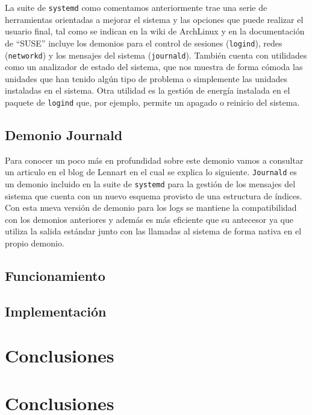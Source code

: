La suite de \texttt{systemd} como comentamos anteriormente trae una serie de herramientas orientadas a mejorar el sistema y las opciones que puede realizar el usuario final, tal como se indican en la wiki de ArchLinux \cite{systemd_es} y en la documentación de ``SUSE'' \cite{suse_doc} incluye los demonios para el control de sesiones (\texttt{logind}), redes (\texttt{networkd}) y los mensajes del sistema (\texttt{journald}). También cuenta con utilidades como un analizador de estado del sistema, que nos muestra de forma cómoda las unidades que han tenido algún tipo de problema o simplemente las unidades instaladas en el sistema. Otra utilidad es la gestión de energía instalada en el paquete de \texttt{logind} que, por ejemplo, permite un apagado o reinicio del sistema.\\


\subsection{Demonio Journald}
Para conocer un poco más en profundidad sobre este demonio vamos a consultar un articulo en el blog de Lennart \cite{Journald} en el cual se explica lo siguiente. \texttt{Journald} es un demonio incluido en la suite de \texttt{systemd} para la gestión de los mensajes del sistema que cuenta con un nuevo esquema provisto de una estructura de índices. Con esta nueva versión de demonio para los logs se mantiene la compatibilidad con los demonios anteriores y además es más eficiente que su antecesor ya que utiliza la salida estándar junto con las llamadas al sistema de forma nativa en el propio demonio.



\subsection{Funcionamiento}

\subsection{Implementación}

\section{Conclusiones}

\section{Conclusiones} %

